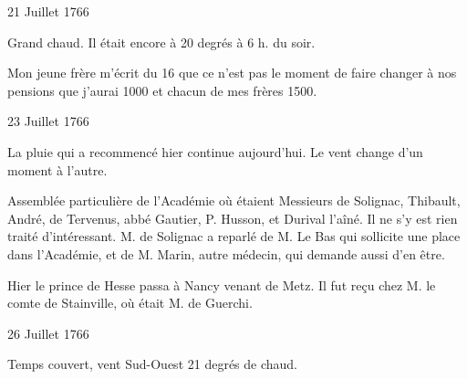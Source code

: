                      \begin{diary}{21 Juillet 1766}{}

                         Grand chaud. Il était encore à
                              20 degrés à 6 h.
                              du soir. \bigskip



                           Mon jeune frère m'écrit
                           du 16 que ce n'est
                           pas le moment de faire changer à nos pensions
                           que j'aurai 1000 et chacun de mes frères
                              1500\up{\#}. \bigskip


                     \end{diary}
                     \begin{diary}{23 Juillet 1766}{}

                         La pluie qui a recommencé hier continue
                           aujourd'hui. Le vent change d'un moment à l'autre. \bigskip


                         Assemblée particulière de l'Académie où étaient
                           Messieurs
                           de Solignac, Thibault, André, de Tervenus,
                           abbé Gautier, P. Husson, et Durival l'aîné. Il ne
                           s'y est rien traité d'intéressant. M.
                              de Solignac
                           a reparlé de M. Le Bas qui
                           sollicite une place
                           dans l'Académie, et de
                              M. Marin, autre
                           médecin, qui demande aussi d'en être. \bigskip


                         Hier le
                              prince de Hesse passa à Nancy
                           venant de Metz. Il fut reçu chez
                           M.
                              le comte de Stainville, où était M. de Guerchi.
                        \bigskip


                     \end{diary}

                     \begin{diary}{26 Juillet 1766}{}


                           Temps couvert, vent Sud-Ouest 21 degrés de chaud. \bigskip


                     \end{diary}

